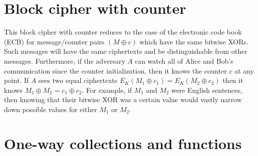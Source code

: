 \documentclass[12pt]{article}
\begin{document}
\section{Block cipher with counter}

This block cipher with counter reduces to the case of the electronic code
book (ECB) for message/counter pairs $(M\oplus c)$ which have the same
bitwise XORs. Such messages will have the same ciphertexts and be
distinguishable from other messages. Furthermore, if the adversary $A$ can
watch all of Alice and Bob's communication since the counter initialization,
then it knows the counter $c$ at any point. If $A$ sees two
equal ciphertexts $E_K(M_1 \oplus c_1) = E_K(M_2 \oplus c_2)$ then it knows
$M_1 \oplus M_2 = c_1 \oplus c_2$. For example, if $M_1$ and $M_2$ were
English sentences, then knowing that their bitwise XOR was a certain value
would vastly narrow down possible values for either $M_1$ or $M_2$.

\pagebreak

\section{One-way collections and functions}
\end{document}
